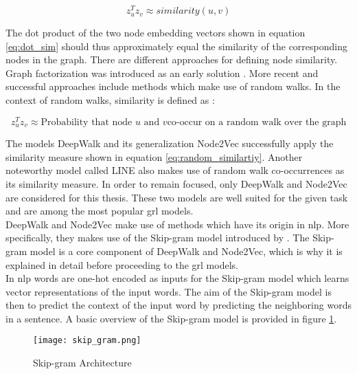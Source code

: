 	\begin{equation}
		z_u^Tz_v \approx similarity(u,v)
		\label{eq:dot_sim}
	\end{equation}

	\noindent The dot product of the two node embedding vectors shown in
	equation \ref{eq:dot_sim} should thus approximately equal the similarity of 
	the corresponding nodes in the graph. There are different approaches for 
	defining node similarity. Graph factorization was introduced as an early 
	solution \citep{ahmed2013distributed}. More recent and successful approaches 
	include methods which make use of random walks. In the context of random 
	walks, similarity is defined as \citep{leskovec2021lecture}:

	\begin{equation}
		z_u^Tz_v \approx \text{Probability that node $u$ and $v$
								co-occur on a random walk over the graph}
	\label{eq:random_similartiy}
	\end{equation}

	\noindent The models DeepWalk \citep{perozzi2014deepwalk} and its 
	generalization Node2Vec \citep{grover2016node2vec} successfully apply the
	similarity measure shown in equation \ref{eq:random_similartiy}. Another 
	noteworthy model called LINE \citep{tang2015line} also makes use of random
	walk co-occurrences as its similarity measure. In order to remain focused,
	only DeepWalk and Node2Vec are considered for this thesis. These two models
	are well suited for the given task and are among the most popular \acs{grl} 
	models. \\

	\noindent DeepWalk and Node2Vec make use of methods which have its origin in 
	\ac{nlp}. More specifically, they makes use of the Skip-gram model introduced by 
	\cite{mikolov2013efficient,mikolov2013distributed}. 
	The Skip-gram model is a core component of DeepWalk and Node2Vec, which is why 
	it is explained in detail before proceeding to the \acs{grl} models. \\

	\noindent In \ac{nlp} words are one-hot encoded as inputs for the Skip-gram 
	model which learns vector representations of the input words. The aim of the
	Skip-gram model is then to predict the context of the input word by
	predicting the neighboring words in a sentence. A basic overview of the 
	Skip-gram model is provided in figure \ref{fig:skip_gram}. 

	\begin{figure}[h]
		\centering
		\texttt{[image: skip\_gram.png]}
		\caption{Skip-gram Architecture}
		\cite[p. 5]{mikolov2013efficient}
		\label{fig:skip_gram}
	\end{figure}

